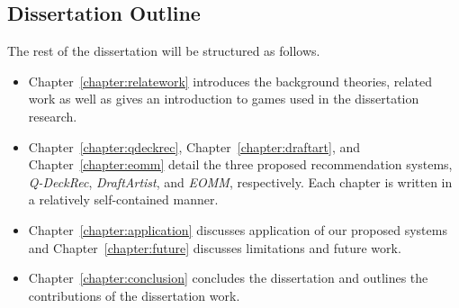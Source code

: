 \subsection{Dissertation Outline}
The rest of the dissertation will be structured as follows. 
\begin{itemize}
\item Chapter~\ref{chapter:relatework} introduces the background theories, related work as well as gives an introduction to games used in the dissertation research. 
\item Chapter~\ref{chapter:qdeckrec}, Chapter~\ref{chapter:draftart}, and Chapter~\ref{chapter:eomm} detail the three proposed recommendation systems, \textit{Q-DeckRec}, \textit{DraftArtist}, and \textit{EOMM}, respectively. Each chapter is written in a relatively self-contained manner.
\item Chapter~\ref{chapter:application} discusses application of our proposed systems and Chapter~\ref{chapter:future} discusses limitations and future work.
\item Chapter~\ref{chapter:conclusion} concludes the dissertation and outlines the contributions of the dissertation work.
\end{itemize}







